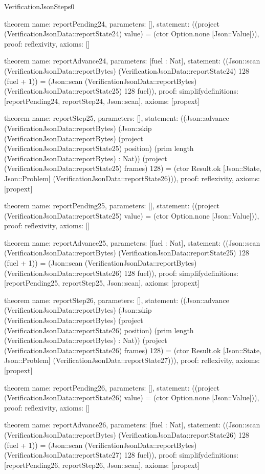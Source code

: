 \begin{lexlean}{VerificationJsonSteps0}
\begin{semanticmodule}
theorem{
  name: reportPending24,
  parameters: [],
  statement: ((project (VerificationJsonData::reportState24) value) = (ctor Option.none [Json::Value])),
  proof: reflexivity{},
  axioms: []
}

theorem{
  name: reportAdvance24,
  parameters: [fuel : Nat],
  statement: ((Json::scan (VerificationJsonData::reportBytes) (VerificationJsonData::reportState24) 128 (fuel + 1)) = (Json::scan (VerificationJsonData::reportBytes) (VerificationJsonData::reportState25) 128 fuel)),
  proof: simplify{definitions: [reportPending24, reportStep24, Json::scan]},
  axioms: [propext]
}

theorem{
  name: reportStep25,
  parameters: [],
  statement: ((Json::advance (VerificationJsonData::reportBytes) (Json::skip (VerificationJsonData::reportBytes) (project (VerificationJsonData::reportState25) position) (prim length (VerificationJsonData::reportBytes) : Nat)) (project (VerificationJsonData::reportState25) frames) 128) = (ctor Result.ok [Json::State, Json::Problem] (VerificationJsonData::reportState26))),
  proof: reflexivity{},
  axioms: [propext]
}

theorem{
  name: reportPending25,
  parameters: [],
  statement: ((project (VerificationJsonData::reportState25) value) = (ctor Option.none [Json::Value])),
  proof: reflexivity{},
  axioms: []
}

theorem{
  name: reportAdvance25,
  parameters: [fuel : Nat],
  statement: ((Json::scan (VerificationJsonData::reportBytes) (VerificationJsonData::reportState25) 128 (fuel + 1)) = (Json::scan (VerificationJsonData::reportBytes) (VerificationJsonData::reportState26) 128 fuel)),
  proof: simplify{definitions: [reportPending25, reportStep25, Json::scan]},
  axioms: [propext]
}

theorem{
  name: reportStep26,
  parameters: [],
  statement: ((Json::advance (VerificationJsonData::reportBytes) (Json::skip (VerificationJsonData::reportBytes) (project (VerificationJsonData::reportState26) position) (prim length (VerificationJsonData::reportBytes) : Nat)) (project (VerificationJsonData::reportState26) frames) 128) = (ctor Result.ok [Json::State, Json::Problem] (VerificationJsonData::reportState27))),
  proof: reflexivity{},
  axioms: [propext]
}

theorem{
  name: reportPending26,
  parameters: [],
  statement: ((project (VerificationJsonData::reportState26) value) = (ctor Option.none [Json::Value])),
  proof: reflexivity{},
  axioms: []
}

theorem{
  name: reportAdvance26,
  parameters: [fuel : Nat],
  statement: ((Json::scan (VerificationJsonData::reportBytes) (VerificationJsonData::reportState26) 128 (fuel + 1)) = (Json::scan (VerificationJsonData::reportBytes) (VerificationJsonData::reportState27) 128 fuel)),
  proof: simplify{definitions: [reportPending26, reportStep26, Json::scan]},
  axioms: [propext]
}


\end{semanticmodule}
\end{lexlean}
